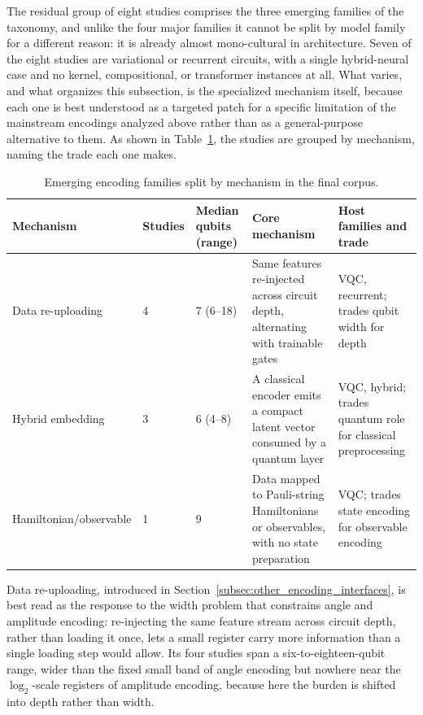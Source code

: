 \documentclass{ieeeaccess}
\begin{document}
The residual group of eight studies comprises the three emerging families of the taxonomy, and unlike the four major families it cannot be split by model family for a different reason: it is already almost mono-cultural in architecture. Seven of the eight studies are variational or recurrent circuits, with a single hybrid-neural case and no kernel, compositional, or transformer instances at all. What varies, and what organizes this subsection, is the specialized mechanism itself, because each one is best understood as a targeted patch for a specific limitation of the mainstream encodings analyzed above rather than as a general-purpose alternative to them. As shown in Table~\ref{tab:specialized_by_mechanism}, the studies are grouped by mechanism, naming the trade each one makes.

\begin{table}[t]
\caption{Emerging encoding families split by mechanism in the final corpus.}
\label{tab:specialized_by_mechanism}
\centering
\scriptsize
\begin{tabular}{@{}p{} p{} p{} p{} p{}@{}}
\hline
\textbf{Mechanism} & \textbf{Studies} & \textbf{Median qubits (range)} & \textbf{Core mechanism} & \textbf{Host families and trade} \\
\hline
Data re-uploading & 4 & 7 (6--18) & Same features re-injected across circuit depth, alternating with trainable gates & VQC, recurrent; trades qubit width for depth \\
Hybrid embedding & 3 & 6 (4--8) & A classical encoder emits a compact latent vector consumed by a quantum layer & VQC, hybrid; trades quantum role for classical preprocessing \\
Hamiltonian/observable & 1 & 9 & Data mapped to Pauli-string Hamiltonians or observables, with no state preparation & VQC; trades state encoding for observable encoding \\
\hline
\end{tabular}
\end{table}

Data re-uploading, introduced in Section~\ref{subsec:other_encoding_interfaces}, is best read as the response to the width problem that constrains angle and amplitude encoding: re-injecting the same feature stream across circuit depth, rather than loading it once, lets a small register carry more information than a single loading step would allow. Its four studies span a six-to-eighteen-qubit range, wider than the fixed small band of angle encoding but nowhere near the $\log_2$-scale registers of amplitude encoding, because here the burden is shifted into depth rather than width.
\end{document}
